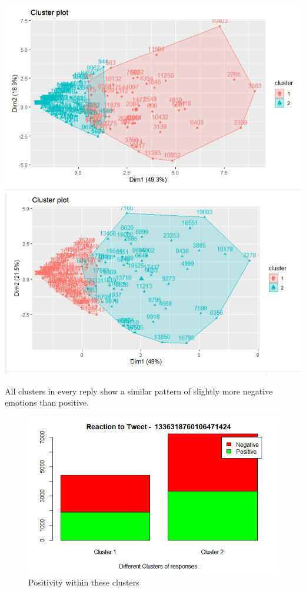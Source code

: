 \documentclass[
]{article}
\begin{document}
\includegraphics{final report resources/Cluster plot.png}
\includegraphics{final report resources/Cluster plot 2.png}

All clusters in every reply show a similar pattern of slightly more
negative emotions than positive.

\begin{figure}
\centering
\includegraphics{final report resources/positivity.png}
\caption{Positivity within these clusters}
\end{figure}
\end{document}
